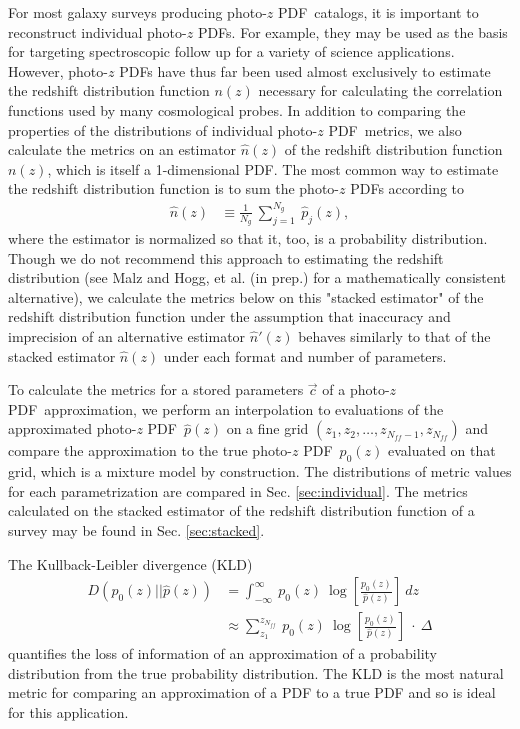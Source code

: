 \documentclass[\docopts]{\docclass}
\newcommand{\pz}{photo-$z$ PDF}
\begin{document}
For most galaxy surveys producing \pz\ catalogs, it is important to reconstruct 
individual \pz s.  For example, they may be used as the basis for targeting 
spectroscopic follow up for a variety of science applications.  However, \pz s 
have thus far been used almost exclusively to estimate the redshift 
distribution function $n(z)$ necessary for calculating the correlation 
functions used by many cosmological probes.  In addition to comparing the 
properties of the distributions of individual \pz\ metrics, we also calculate 
the metrics on an estimator $\hat{n}(z)$ of the redshift distribution function 
$n(z)$, which is itself a 1-dimensional PDF.  The most common way to estimate 
the redshift distribution function is to sum the \pz s according to
\begin{align}
  \label{eq:nz}
  \hat{n}(z) &\equiv \frac{1}{N_{g}}\ \sum_{j=1}^{N_{g}}\ \hat{p}_{j}(z),
\end{align}
where the estimator is normalized so that it, too, is a probability 
distribution.  Though we do not recommend this approach to estimating the 
redshift distribution (see Malz and Hogg, et al. (in prep.) for a 
mathematically consistent alternative), we calculate the metrics below on this 
"stacked estimator" of the redshift distribution function under the assumption 
that inaccuracy and imprecision of an alternative estimator $\hat{n}'(z)$ 
behaves similarly to that of the stacked estimator $\hat{n}(z)$ under each 
format and number of parameters.

To calculate the metrics for a stored parameters $\vec{c}$ of a \pz\ 
approximation, we perform an interpolation to evaluations of the approximated 
\pz\ $\hat{p}(z)$ on a fine grid $(z_{1}, z_{2}, \dots, z_{N_{ff}-1}, 
z_{N_{ff}})$ and compare the approximation to the true \pz\ $p_{0}(z)$ 
evaluated on that grid, which is a mixture model by construction.  The 
distributions of metric values for each parametrization are compared in Sec. 
\ref{sec:individual}.  The metrics calculated on the stacked estimator of the 
redshift distribution function of a survey may be found in Sec. 
\ref{sec:stacked}.





The Kullback-Leibler divergence (KLD)
\begin{align}
  \label{eq:kld}
  D(p_{0}(z) || \hat{p}(z)) &= \int_{-\infty}^{\infty}\ p_{0}(z)\ 
\log\left[\frac{p_{0}(z)}{\hat{p}(z)}\right]\ dz\\
  &\approx \sum_{z_{1}}^{z_{N_{ff}}}\ p_{0}(z)\ 
\log\left[\frac{p_{0}(z)}{\hat{p}(z)}\right]\ \cdot\ \Delta
\end{align}
quantifies the loss of information of an approximation of a probability 
distribution from the true probability distribution.  The KLD is the most 
natural metric for comparing an approximation of a PDF to a true PDF and so is 
ideal for this application.
\end{document}
